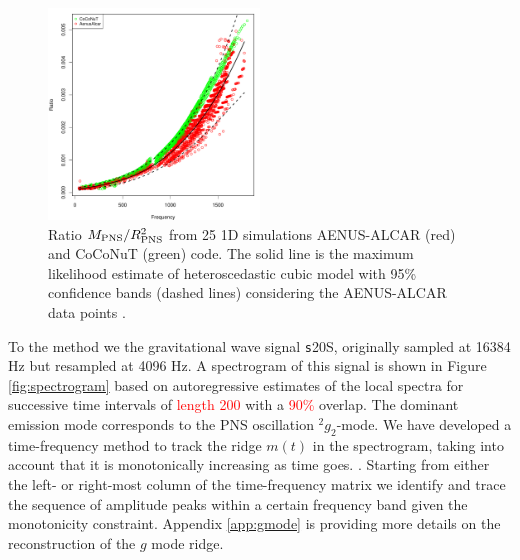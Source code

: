 \begin{figure}
 \centering
 \includegraphics[width=0.5\textwidth]{plots/model}
 \caption{Ratio $M_{\rm PNS}/R_{\rm PNS}^2$ from 25 1D simulations {\sc AENUS-ALCAR} (red) and {\sc CoCoNuT} (green) code. The solid line is the maximum likelihood estimate of heteroscedastic cubic model with 95\% confidence bands (dashed lines) considering  the  {\sc AENUS-ALCAR} data points .} \label{fig:LMVAR}
\end{figure}

To  the method we  the gravitational wave signal
 {\texttt s20S}, originally
sampled at 16384 Hz but resampled at 4096 Hz.
A spectrogram of this signal is shown in Figure \ref{fig:spectrogram} based on
autoregressive estimates \pcd{[CITATION?]}of the local spectra for successive time intervals of 
\textcolor{red}{length 200} with a \textcolor{red}{ 90\%} overlap.
The dominant emission mode corresponds to the PNS oscillation $\mbox{}^2 g_2$-mode. We have
developed a time-frequency method to track the ridge $m(t)$ in the spectrogram,
taking into account that it is monotonically increasing as time goes. 
.
Starting from either the left- or right-most column of the time-frequency matrix
we identify and trace the sequence of amplitude peaks within a certain frequency
band given the monotonicity constraint. Appendix \ref{app:gmode} is providing more
details on the reconstruction of the $g$ mode ridge. 


